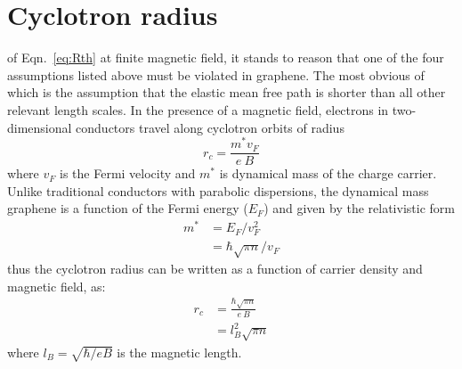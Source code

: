 \section{Cyclotron radius}
 of Eqn.~\ref{eq:Rth} at finite magnetic field, it stands to reason that one of the four assumptions listed above must be violated in graphene. The most obvious of which is the assumption that the elastic mean free path is shorter than all other relevant length scales. In the presence of a magnetic field, electrons in two-dimensional conductors travel along cyclotron orbits of radius 
\begin{equation}
r_c=\frac{m^*v_F}{e~B}
\end{equation}
where $v_F$ is the Fermi velocity and $m^*$ is dynamical mass of the charge carrier. Unlike traditional conductors with parabolic dispersions, the dynamical mass graphene is a function of the Fermi energy ($E_F$) and given by the relativistic form 
\begin{align}
m^* &= E_F/v_F^2 \\
 &= \hbar\sqrt{\pi n}/v_F
\end{align}
thus the cyclotron radius can be written as a function of carrier density and magnetic field, as:
\begin{align}
r_c &= \frac{\hbar\sqrt{\pi n}}{e~B} \\
 &= l_B^2\sqrt{\pi n}
\end{align}
where $l_B = \sqrt{\hbar/eB}$ is the magnetic length. 

